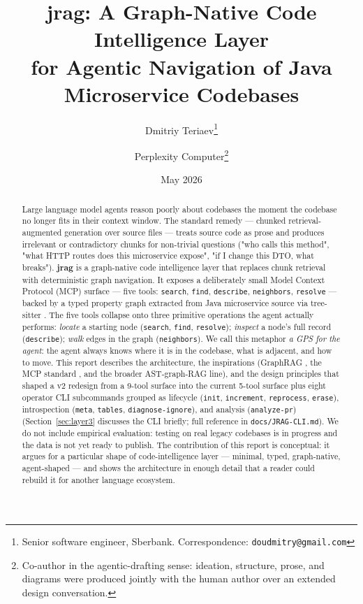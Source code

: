 \documentclass[11pt,a4paper]{article}
\title{\textbf{jrag}: A Graph-Native Code Intelligence Layer\\for Agentic Navigation of Java Microservice Codebases}
\author{
  Dmitriy Teriaev\thanks{Senior software engineer, Sberbank. Correspondence: \texttt{doudmitry@gmail.com}}
  \and
  Perplexity Computer\thanks{Co-author in the agentic-drafting sense: ideation, structure, prose, and diagrams were produced jointly with the human author over an extended design conversation.}
}
\date{May 2026}
\begin{document}
\maketitle

\begin{abstract}
\noindent
Large language model agents reason poorly about codebases the moment the codebase no longer fits in their context window. The standard remedy --- chunked retrieval-augmented generation over source files \cite{lewis2020rag} --- treats source code as prose and produces irrelevant or contradictory chunks for non-trivial questions ("who calls this method", "what HTTP routes does this microservice expose", "if I change this DTO, what breaks"). \textbf{jrag} is a graph-native code intelligence layer that replaces chunk retrieval with deterministic graph navigation. It exposes a deliberately small Model Context Protocol (MCP) surface --- five tools: \texttt{search}, \texttt{find}, \texttt{describe}, \texttt{neighbors}, \texttt{resolve} --- backed by a typed property graph extracted from Java microservice source via tree-sitter \cite{treesitter}. The five tools collapse onto three primitive operations the agent actually performs: \emph{locate} a starting node (\texttt{search}, \texttt{find}, \texttt{resolve}); \emph{inspect} a node's full record (\texttt{describe}); \emph{walk} edges in the graph (\texttt{neighbors}). We call this metaphor \emph{a GPS for the agent}: the agent always knows where it is in the codebase, what is adjacent, and how to move. This report describes the architecture, the inspirations (GraphRAG \cite{edge2024graphrag}, the MCP standard \cite{anthropic2024mcp}, and the broader AST-graph-RAG line), and the design principles that shaped a v2 redesign from a 9-tool surface into the current 5-tool surface plus eight operator CLI subcommands grouped as lifecycle (\texttt{init}, \texttt{increment}, \texttt{reprocess}, \texttt{erase}), introspection (\texttt{meta}, \texttt{tables}, \texttt{diagnose-ignore}), and analysis (\texttt{analyze-pr}) (Section~\ref{sec:layer3} discusses the CLI briefly; full reference in \texttt{docs/JRAG-CLI.md}). We do not include empirical evaluation: testing on real legacy codebases is in progress and the data is not yet ready to publish. The contribution of this report is conceptual: it argues for a particular shape of code-intelligence layer --- minimal, typed, graph-native, agent-shaped --- and shows the architecture in enough detail that a reader could rebuild it for another language ecosystem.
\end{abstract}
\end{document}
